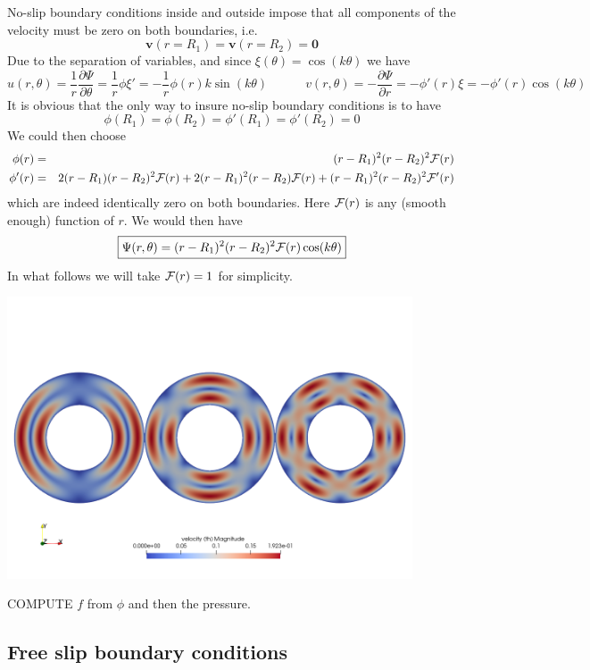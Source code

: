 No-slip boundary conditions inside and outside impose that all components of the velocity
must be zero on both boundaries, i.e.
\[
{\bm v}(r=R_1)={\bm v}(r=R_2)={\bm 0}
\]
Due to the separation of variables, and since  $\xi(\theta)=\cos(k\theta)$ we have
\[
u(r,\theta) = \frac{1}{r}\frac{\partial \Psi}{\partial \theta} 
=\frac{1}{r} \phi \xi' 
=-\frac{1}{r} \phi(r) k \sin(k \theta) 
\quad\quad\quad
v(r,\theta) = - \frac{\partial \Psi}{\partial r} 
= - \phi'(r) \xi 
= - \phi'(r) \cos(k\theta)
\]
It is obvious that the only way to insure no-slip boundary conditions is to have 
\[
\phi(R_1)=\phi(R_2)=\phi'(R_1)=\phi'(R_2)=0
\]
We could then choose
\begin{eqnarray}
\phi(r)&=&(r-R_1)^2(r-R_2)^2 {\cal F}(r) \\
\phi'(r)&=&2(r-R_1)(r-R_2)^2 {\cal F}(r)  +2(r-R_1)^2(r-R_2) {\cal F}(r) +(r-R_1)^2(r-R_2)^2 {\cal F}'(r)
\end{eqnarray}
which are indeed identically zero on both boundaries. Here ${\cal F}(r)$ is any (smooth enough) function of $r$.
We would then have
\[
\boxed{
\Psi(r,\theta) = (r-R_1)^2(r-R_2)^2 {\cal F}(r) \cos(k\theta)
}
\]
In what follows we will take ${\cal F}(r)=1$ for simplicity.

\begin{center}
\includegraphics[width=12cm]{python_codes/fieldstone_35/images/vels}
\end{center}

COMPUTE $f$ from $\phi$ and then the pressure.


\subsection{Free slip boundary conditions}

